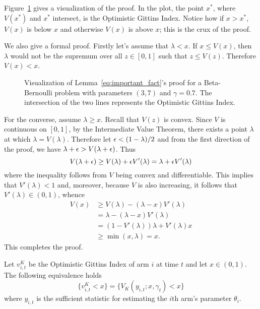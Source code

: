 \begin{myproof}[Proof.]
	Figure~\ref{fig:visaulize_gx_proof} gives a visualization of the proof. In the plot, the point $x^*$, where $V(x^*)$ and $x^*$ intersect, is the Optimistic Gittins Index. Notice how if $x > x^*$, $V(x)$ is below $x$ and otherwise $V(x)$ is above $x$; this is the crux of the proof.
	
	We also give a formal proof. Firstly let's assume that $\lambda < x$. If $x\le V(x)$, then $\lambda$ would not be the supremum over all $z \in [0,1]$ such that $ z \le V(z)$. Therefore $V(x) < x$.
	
	\begin{figure}
		\centering
		
		\caption{Visualization of Lemma~\ref{eq:important_fact}'s proof for a Beta-Bernoulli problem with parameters $(3,7)$ and $\gamma=0.7$. The intersection of the two lines represents the Optimistic Gittins Index.}
		\label{fig:visaulize_gx_proof}
	\end{figure}
	
	For the converse, assume $\lambda \ge x$. Recall that $V(z)$ is convex. Since $V$ is continuous on $[0,1]$, by the Intermediate Value Theorem, there exists a point $\lambda$ at which $\lambda =V(\lambda)$. Therefore let $\epsilon < (1-\lambda)/2$ and from the first direction of the proof, we have $\lambda + \epsilon > V(\lambda + \epsilon)$. Thus
	\[
	V(\lambda + \epsilon) \ge V(\lambda) + \epsilon V'(\lambda) = \lambda + \epsilon V'(\lambda)
	\]
	where the inequality follows from $V$ being convex and differentiable. This implies that $V'(\lambda) < 1$ and, moreover, because $V$ is also increasing, it follows that $V'(\lambda) \in (0,1)$, whence
	\begin{align*}
	V(x) & \ge V(\lambda) - (\lambda - x) V'(\lambda) \\
	& = \lambda - (\lambda - x) V'(\lambda) \\
	& = (1-V'(\lambda)) \lambda + V'(\lambda) x \\
	& \ge \min(x,\lambda) = x.
	\end{align*}
	This completes the proof.
\end{myproof}
\begin{corollary} \label{cor:equivalent_event}
	Let $v^K_{i,t}$ be the Optimistic Gittins Index of arm $i$ at time $t$ and let $x \in (0,1)$. The following equivalence holds
	\[
	\{v^K_{i,t} < x \} = \{V_K(y_{i,t}; x, \gamma_t) < x\}\]
	where $y_{i,t}$ is the sufficient statistic for estimating the $i$th arm's parameter $\theta_i$.
\end{corollary}
